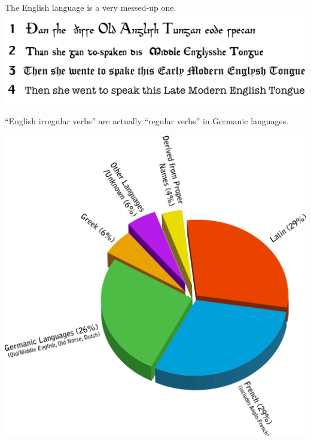 \documentclass[11pt]{beamer}
\begin{document}
\begin{frame}[allowframebreaks]{The English language is a very messed-up one.}
 \includegraphics[width=\textwidth]{old_English_to_modern_English.png}
 
 ``English irregular verbs'' are actually ``regular verbs'' in Germanic languages. 
 
 \includegraphics[width=.8\textwidth]{Origins_of_English_PieChart.png}
\end{frame}
\end{document}
